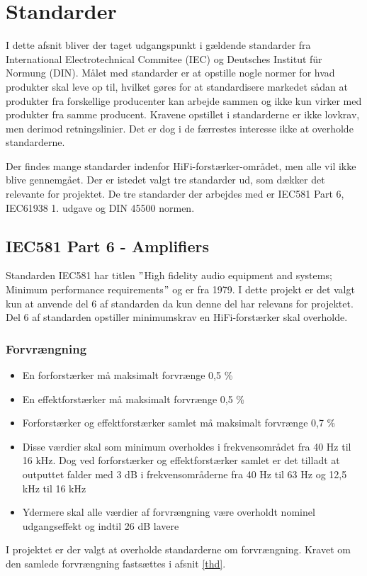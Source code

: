 \section{Standarder}
\label{standarder}
I dette afsnit bliver der taget udgangspunkt i gældende standarder fra International Electrotechnical Commitee (IEC) og Deutsches Institut f\"{u}r Normung (DIN). Målet med standarder er at opstille nogle normer for hvad produkter skal leve op til, hvilket gøres for at standardisere markedet sådan at produkter fra forskellige producenter kan arbejde sammen og ikke kun virker med produkter fra samme producent. Kravene opstillet i standarderne er ikke lovkrav, men derimod retningslinier. Det er dog i de færrestes interesse ikke at overholde standarderne.

Der findes mange standarder indenfor HiFi-forstærker-området, men alle vil ikke blive gennemgået. Der er istedet valgt tre standarder ud, som dækker det relevante for projektet. De tre standarder der arbejdes med er IEC581 Part 6, IEC61938 1. udgave og DIN 45500 normen. 

\subsection*{IEC581 Part 6 - Amplifiers}
\label{IEC581}
Standarden IEC581 har titlen $"$High fidelity audio equipment and systems; Minimum performance requirements$"$ og er fra 1979. I dette projekt er det valgt kun at anvende del 6 af standarden da kun denne del har relevans for projektet. Del 6 af standarden opstiller minimumskrav en HiFi-forstærker skal overholde\cite{IEC581-6}.
\subsubsection*{Forvrængning}
\begin{itemize}
\item En forforstærker må maksimalt forvrænge 0,5 \%
\item En effektforstærker må maksimalt forvrænge 0,5 \%
\item Forforstærker og effektforstærker samlet må maksimalt forvrænge 0,7 \%
\item Disse værdier skal som minimum overholdes i frekvensområdet fra 40 Hz til 16 kHz. Dog ved forforstærker og effektforstærker samlet er det tilladt at outputtet falder med 3 dB i frekvensområderne fra 40 Hz til 63 Hz og 12,5 kHz til 16 kHz
\item Ydermere skal alle værdier af forvrængning være overholdt nominel udgangseffekt og indtil 26 dB lavere 
\end{itemize}
I projektet er der valgt at overholde standarderne om forvrængning. Kravet om den samlede forvrængning fastsættes i afsnit \ref{thd}. 

